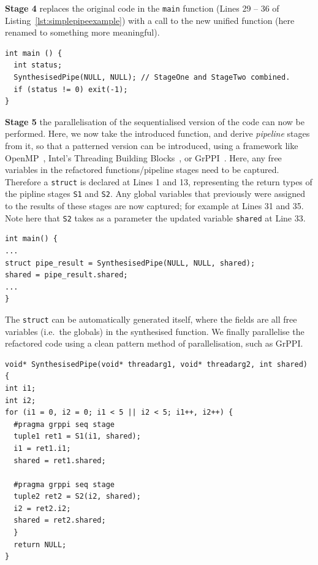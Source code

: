 \noindent
\textbf{Stage 4} replaces the original code in the \lstinline{main} function (Lines 29 -- 36 of Listing~\ref{lst:simplepipeexample}) with a call to the new unified function (here renamed to something more meaningful).

  \begin{lstlisting}[frame=single]
int main () {
  int status;
  SynthesisedPipe(NULL, NULL); // StageOne and StageTwo combined.
  if (status != 0) exit(-1);
}
\end{lstlisting}

\noindent
\textbf{Stage 5} the parallelisation of the sequentialised version of the code can now be performed. Here, we now take the introduced function, and derive \emph{pipeline} stages from it, so that a patterned version can be introduced, using a framework like OpenMP~\cite{10.1109/99.660313}, Intel's Threading Building Blocks~\cite{DBLP:reference/parallel/X11pz}, or GrPPI~\cite{DBLP:journals/concurrency/AstorgaD0G17}. Here, any free variables in the refactored functions/pipeline stages need to be captured. Therefore a \lstinline|struct| is declared at Lines 1 and 13, representing the return types of the pipline stages \lstinline|S1| and \lstinline|S2|. Any global variables that previously were assigned to the results of these stages are now captured; for example at Lines 31 and 35. Note here that \lstinline{S2} takes as a parameter the updated variable \lstinline{shared} at Line 33. 

\begin{lstlisting}[frame=single]
int main() {
...
struct pipe_result = SynthesisedPipe(NULL, NULL, shared);
shared = pipe_result.shared;
...
}
\end{lstlisting}
The \lstinline|struct| can be automatically generated itself, where the fields are all free variables (i.e.\ the globals) in the synthesised function.
%
We finally parallelise the refactored code using a clean pattern method of parallelisation, such as GrPPI.

\begin{lstlisting}[frame=single]
void* SynthesisedPipe(void* threadarg1, void* threadarg2, int shared) {
int i1;
int i2;
for (i1 = 0, i2 = 0; i1 < 5 || i2 < 5; i1++, i2++) {
  #pragma grppi seq stage
  tuple1 ret1 = S1(i1, shared);
  i1 = ret1.i1;
  shared = ret1.shared;

  #pragma grppi seq stage
  tuple2 ret2 = S2(i2, shared);
  i2 = ret2.i2;
  shared = ret2.shared;
  }
  return NULL;
}
\end{lstlisting}

